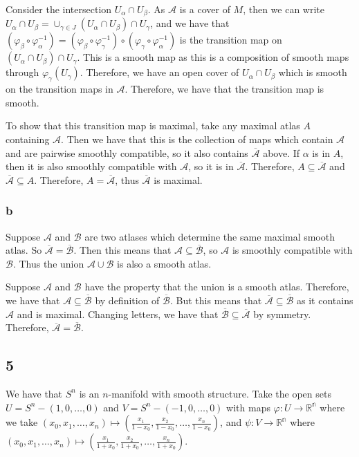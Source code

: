 \documentclass{article}
\theoremstyle{definition}
\numberwithin{theorem}{section}
\numberwithin{equation}{section}
\newcommand{\atlas}{\mathcal{A}}
\begin{document}
Consider the intersection $U_\alpha \cap U_\beta$. As $\atlas$ is a cover of $M$, then we can write $U_\alpha \cap U_\beta = \cup_{\gamma \in J} (U_\alpha \cap U_\beta) \cap U_\gamma$, and we have that $(\varphi_\beta \circ \varphi_\alpha^{-1}) = (\varphi_\beta \circ \varphi_\gamma^{-1}) \circ (\varphi_\gamma \circ \varphi_\alpha^{-1})$ is the transition map on $(U_\alpha \cap U_\beta) \cap U_\gamma$. This is a smooth map as this is a composition of smooth maps through $\varphi_\gamma(U_\gamma)$. Therefore, we have an open cover of $U_\alpha \cap U_\beta$ which is smooth on the transition maps in $\atlas$. Therefore, we have that the transition map is smooth.

To show that this transition map is maximal, take any maximal atlas $A$ containing $\atlas$. Then we have that this is the collection of maps which contain $\atlas$ and are pairwise smoothly compatible, so it also contains $\overline{\atlas}$ above. If $\alpha$ is in $A$, then it is also smoothly compatible with $\atlas$, so it is in $\overline{\atlas}$. Therefore, $A \subseteq \overline{\atlas}$ and $\overline{\atlas} \subseteq A$. Therefore, $A = \overline{\atlas}$, thus $\overline{\atlas}$ is maximal. 
\subsubsection{b}

Suppose $\mathcal{A}$ and $\mathcal{B}$ are two atlases which determine the same maximal smooth atlas. So $\overline{\mathcal{A}} = \overline{\mathcal{B}}$. Then this means that $\mathcal{A} \subseteq \overline{\mathcal{B}}$, so $\mathcal{A}$ is smoothly compatible with $\mathcal{B}$. Thus the union $\mathcal{A} \cup \mathcal{B}$ is also a smooth atlas. 

Suppose $\mathcal{A}$ and $\mathcal{B}$ have the property that the union is a smooth atlas. Therefore, we have that $\mathcal{A} \subseteq \overline{\mathcal{B}}$ by definition of $\overline{\mathcal{B}}$. But this means that $\overline{\mathcal{A}} \subseteq \overline{\mathcal{B}}$ as it contains $\mathcal{A}$ and is maximal. Changing letters, we have that $\overline{\mathcal{B}} \subseteq \overline{\mathcal{A}}$ by symmetry. Therefore, $\overline{\mathcal{A}} = \overline{\mathcal{B}}$.

\subsection{5}
We have that $S^n$ is an $n$-manifold with smooth structure. Take the open sets $U = S^n - (1, 0, \ldots, 0)$ and $V = S^n - (-1, 0, \ldots, 0)$ with maps $\varphi : U \rightarrow \mathbb{R^n}$ where we take $(x_0, x_1, \ldots, x_n) \mapsto (\frac{x_1}{1- x_0}, \frac{x_2}{1- x_0}, \ldots, \frac{x_n}{1- x_0} )$, and $\psi : V \rightarrow \mathbb{R^n}$ where $(x_0, x_1, \ldots, x_n) \mapsto (\frac{x_1}{1+x_0}, \frac{x_2}{1+ x_0}, \ldots, \frac{x_n}{1+x_0} )$. 
\end{document}
